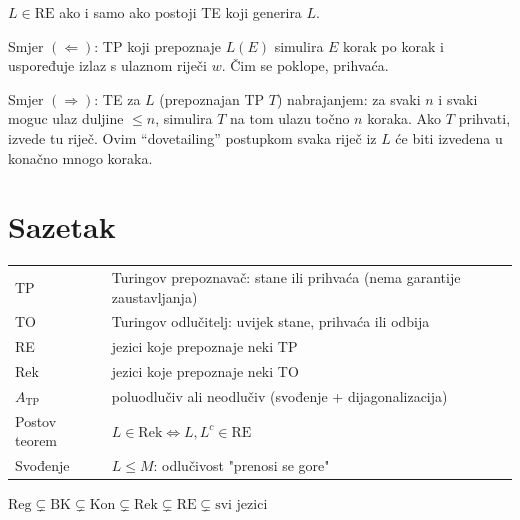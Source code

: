 \begin{propozicija}
$L \in \mathrm{RE}$ ako i samo ako postoji TE koji generira $L$.
\end{propozicija}

Smjer $(\Leftarrow)$: TP koji prepoznaje $L(E)$ simulira $E$ korak po
korak i uspoređuje izlaz s ulaznom riječi $w$. Čim se poklope,
prihvaća.

Smjer $(\Rightarrow)$: TE za $L$ (prepoznajan TP $T$) nabrajanjem:
za svaki $n$ i svaki moguc ulaz duljine $\leq n$, simulira $T$ na tom
ulazu točno $n$ koraka. Ako $T$ prihvati, izvede tu riječ.
Ovim ``dovetailing'' postupkom svaka riječ iz $L$ će biti izvedena
u konačno mnogo koraka.

\section*{Sazetak}

\medskip\noindent
\begin{tabular}{ll}
  TP & Turingov prepoznavač: stane ili prihvaća (nema garantije zaustavljanja) \\
  TO & Turingov odlučitelj: uvijek stane, prihvaća ili odbija \\
  RE & jezici koje prepoznaje neki TP \\
  Rek & jezici koje prepoznaje neki TO \\
  $A_\mathrm{TP}$ & poluodlučiv ali neodlučiv (svođenje + dijagonalizacija) \\
  Postov teorem & $L \in \mathrm{Rek} \iff L, L^c \in \mathrm{RE}$ \\
  Svođenje & $L \leq M$: odlučivost "prenosi se gore" \\
\end{tabular}

\medskip\noindent
\begin{center}
\Large\itshape
$\mathrm{Reg} \subsetneq \mathrm{BK} \subsetneq \mathrm{Kon} \subsetneq \mathrm{Rek} \subsetneq \mathrm{RE} \subsetneq \text{svi jezici}$
\end{center}